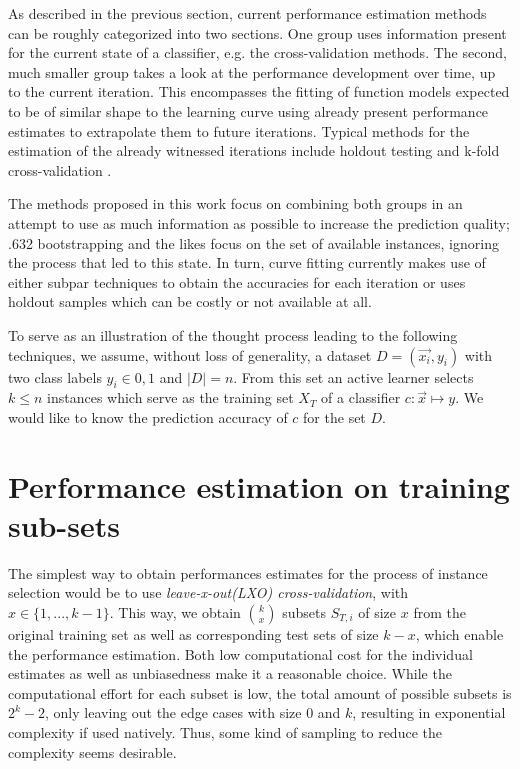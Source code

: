 \label{methods}
As described in the previous section, current performance estimation methods can be roughly categorized into two sections. One group uses information present for the current state of a classifier, e.g. the cross-validation methods. The second, much smaller group takes a look at the performance development over time, up to the current iteration. This encompasses the fitting of function models expected to be of similar shape to the learning curve using already present performance estimates to extrapolate them to future iterations. Typical methods for the estimation of the already witnessed iterations include holdout testing and k-fold cross-validation \cite{FigueroaEtal2012}.

The methods proposed in this work focus on combining both groups in an attempt to use as much information as possible to increase the prediction quality; .632 bootstrapping and the likes focus on the set of available instances, ignoring the process that led to this state. In turn, curve fitting currently makes use of either subpar techniques to obtain the accuracies for each iteration or uses holdout samples which can be costly or not available at all.

To serve as an illustration of the thought process leading to the following techniques, we assume, without loss of generality, a dataset $D = {(\vec{x_i}, y_i)}$ with two class labels $y_i \in {0, 1}$ and $|D| = n$. From this set an active learner selects $k \leq n$ instances which serve as the training set $X_T$ of a classifier $c: \vec{x} \mapsto y$. We would like to know the prediction accuracy of $c$ for the set $D$.

\section{Performance estimation on training sub-sets}
The simplest way to obtain performances estimates for the process of instance selection would be to use \textit{leave-x-out(LXO) cross-validation}, with $x \in \{1,...,k-1\}$. This way, we obtain $k \choose x$ subsets $S_{T,i}$ of size $x$ from the original training set as well as corresponding test sets of size $k-x$, which enable the performance estimation. Both low computational cost for the individual estimates as well as unbiasedness \cite{RodriguezEtAl2013} make it a reasonable choice. While the computational effort for each subset is low, the total amount of possible subsets is $2^k - 2$, only leaving out the edge cases with size 0 and $k$, resulting in exponential complexity if used natively. Thus, some kind of sampling to reduce the complexity seems desirable.

